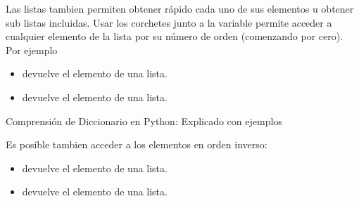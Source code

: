 \documentclass[a5paper,9pt,spanish]{sphinxmanual}
\begin{document}
\sphinxAtStartPar
Las listas tambien permiten obtener rápido cada uno de sus elementos u
obtener sub listas incluidas.
Usar los corchetes junto a la variable permite acceder a cualquier elemento
de la lista por su número de orden (comenzando por cero).
Por ejemplo
\begin{itemize}
\item {} 
\sphinxAtStartPar
{} devuelve el  elemento de una lista.

\item {} 
\sphinxAtStartPar
{} devuelve el  elemento de una lista.

\end{itemize}

\sphinxAtStartPar
{}

\sphinxAtStartPar
Comprensión de Diccionario en Python: Explicado con ejemplos

\sphinxAtStartPar
Es posible tambien acceder a los elementos en orden inverso:
\begin{itemize}
\item {} 
\sphinxAtStartPar
{} devuelve el  elemento de una lista.

\item {} 
\sphinxAtStartPar
{} devuelve el  elemento de una lista.

\end{itemize}
\end{document}
